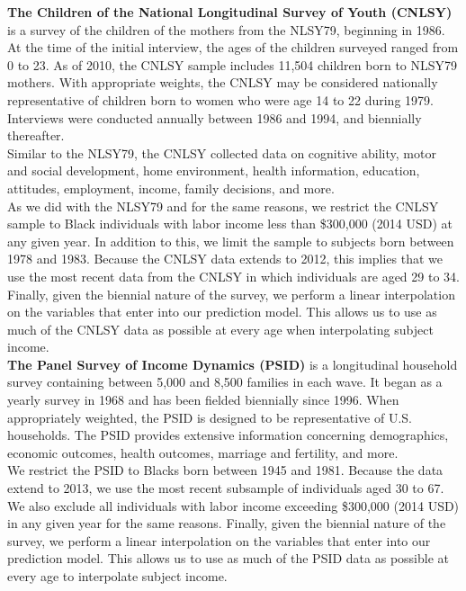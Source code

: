 \noindent\textbf{The Children of the National Longitudinal Survey of Youth (CNLSY)} is a survey of the children of the mothers from the NLSY79, beginning in 1986. At the time of the initial interview, the ages of the children surveyed ranged from 0 to 23. As of 2010, the CNLSY sample includes 11,504 children born to NLSY79 mothers. With appropriate weights, the CNLSY may be considered nationally representative of children born to women who were age 14 to 22 during 1979. Interviews were conducted annually between 1986 and 1994, and biennially thereafter.\\

\noindent Similar to the NLSY79, the CNLSY collected data on cognitive ability, motor and social development, home environment, health information, education, attitudes, employment, income, family decisions, and more.\\

\noindent As we did with the NLSY79 and for the same reasons, we restrict the CNLSY sample to Black individuals with labor income less than \$300,000 (2014 USD) at any given year. In addition to this, we limit the sample to subjects born between 1978 and 1983. Because the CNLSY data extends to 2012, this implies that we use the most recent data from the CNLSY in which individuals are aged 29 to 34. Finally, given the biennial nature of the survey, we perform a linear interpolation on the variables that enter into our prediction model. This allows us to use as much of the CNLSY data as possible at every age when interpolating subject income.\\

\noindent\textbf{The Panel Survey of Income Dynamics (PSID)} is a longitudinal household survey containing between 5,000 and 8,500 families in each wave. It began as a yearly survey in 1968 and has been fielded biennially since 1996. When appropriately weighted, the PSID is designed to be representative of U.S. households. The PSID provides extensive information concerning demographics, economic outcomes, health outcomes, marriage and fertility, and more.\\

\noindent We restrict the PSID to Blacks born between 1945 and 1981. Because the data extend to 2013, we use the most recent subsample of individuals aged 30 to 67. We also exclude all individuals with labor income exceeding \$300,000 (2014 USD) in any given year for the same reasons. Finally, given the biennial nature of the survey, we perform a linear interpolation on the variables that enter into our prediction model. This allows us to use as much of the PSID data as possible at every age to interpolate subject income.\\

